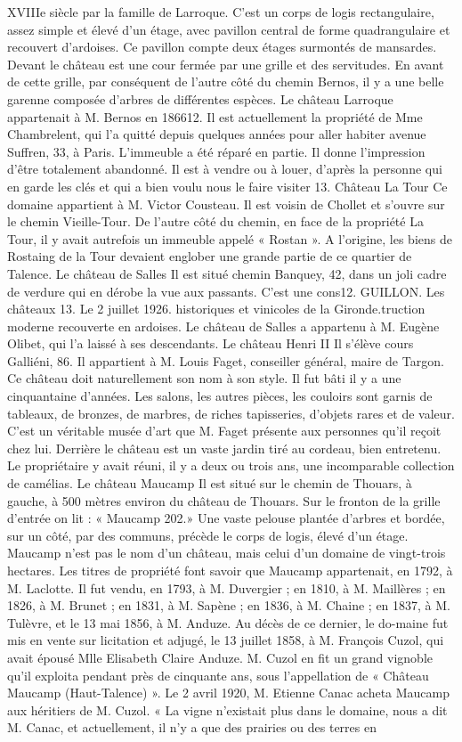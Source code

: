 XVIIIe siècle par la famille de Larroque. C'est un corps de logis rectangulaire, assez simple et élevé d'un étage, avec pavillon central de forme quadrangulaire et recouvert d'ardoises. Ce pavillon compte deux étages surmontés de mansardes. Devant le château est une cour fermée par une grille et des servitudes. En avant de cette grille, par conséquent de l'autre côté du chemin Bernos, il y a une belle garenne composée d'arbres de différentes espèces. Le château Larroque appartenait à M. Bernos en 186612. Il est actuellement la propriété de Mme Chambrelent, qui l'a quitté depuis quelques années pour aller habiter avenue Suffren, 33, à Paris. L'immeuble a été réparé en partie. Il donne l'impression d'être totalement abandonné. Il est à vendre ou à louer, d'après la personne qui en garde les clés et qui a bien voulu nous le faire visiter 13. Château La Tour Ce domaine appartient à M. Victor Cousteau. Il est voisin de Chollet et s'ouvre sur le chemin Vieille-Tour. De l'autre côté du chemin, en face de la propriété La Tour, il y avait autrefois un immeuble appelé « Rostan ». A l'origine, les biens de Rostaing de la Tour devaient englober une grande partie de ce quartier de Talence. Le château de Salles Il est situé chemin Banquey, 42, dans un joli cadre de verdure qui en dérobe la vue aux passants. C'est une cons12. GUILLON. Les châteaux 13. Le 2 juillet 1926. historiques et vinicoles de la Gironde.truction moderne recouverte en ardoises. Le château de Salles a appartenu à M. Eugène Olibet, qui l'a laissé à ses descendants. Le château Henri II Il s'élève cours Galliéni, 86. Il appartient à M. Louis Faget, conseiller général, maire de Targon. Ce château doit naturellement son nom à son style. Il fut bâti il y a une cinquantaine d'années. Les salons, les autres pièces, les couloirs sont garnis de tableaux, de bronzes, de marbres, de riches tapisseries, d'objets rares et de valeur. C'est un véritable musée d'art que M. Faget présente aux personnes qu'il reçoit chez lui. Derrière le château est un vaste jardin tiré au cordeau, bien entretenu. Le propriétaire y avait réuni, il y a deux ou trois ans, une incomparable collection de camélias. Le château Maucamp Il est situé sur le chemin de Thouars, à gauche, à 500 mètres environ du château de Thouars. Sur le fronton de la grille d'entrée on lit : « Maucamp 202.» Une vaste pelouse plantée d'arbres et bordée, sur un côté, par des communs, précède le corps de logis, élevé d'un étage. Maucamp n'est pas le nom d'un château, mais celui d'un domaine de vingt-trois hectares. Les titres de propriété font savoir que Maucamp appartenait, en 1792, à M. Laclotte. Il fut vendu, en 1793, à M. Duvergier ; en 1810, à M. Maillères ; en 1826, à M. Brunet ; en 1831, à M. Sapène ; en 1836, à M. Chaine ; en 1837, à M. Tulèvre, et le 13 mai 1856, à M. Anduze. Au décès de ce dernier, le do-maine fut mis en vente sur licitation et adjugé, le 13 juillet 1858, à M. François Cuzol, qui avait épousé Mlle Elisabeth Claire Anduze. M. Cuzol en fit un grand vignoble qu'il exploita pendant près de cinquante ans, sous l'appellation de « Château Maucamp (Haut-Talence) ». Le 2 avril 1920, M. Etienne Canac acheta Maucamp aux héritiers de M. Cuzol. « La vigne n'existait plus dans le domaine, nous a dit M. Canac, et actuellement, il n'y a que des prairies ou des terres en 